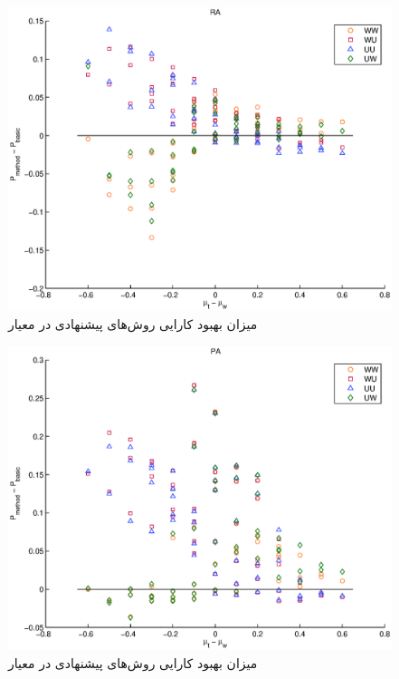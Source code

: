\begin{figure}[!htb]
  \begin{center}
    \includegraphics[width=12cm]{scatter_diff_RA.eps}
    \caption{میزان بهبود کارایی روش‌های پیشنهادی در معیار }
    \label{fig:scatter_diff_RA}
  \end{center}
\end{figure}
\begin{figure}[!htb]
  \begin{center}
    \includegraphics[width=12cm]{scatter_diff_PA.eps}
    \caption{میزان بهبود کارایی روش‌های پیشنهادی در معیار }
    \label{fig:scatter_diff_PA}
  \end{center}
\end{figure}

